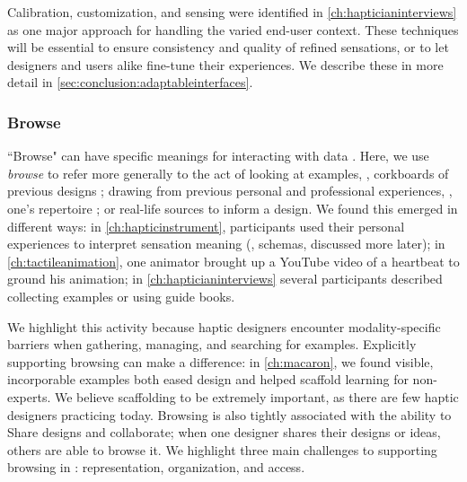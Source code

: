 
Calibration, customization, and sensing were identified in \autoref{ch:hapticianinterviews} as one major approach for handling the varied end-user context. 
These techniques will be essential to ensure consistency and quality of refined sensations, or to let designers and users alike fine-tune their experiences.
We describe these in more detail in \autoref{sec:conclusion:adaptableinterfaces}.


%
%
\subsubsection{Browse} 
``Browse" can have specific meanings for interacting with data \cite{munzner2014visualization}.
Here, we use \emph{browse} to refer more generally to the act of looking at examples, \eg, corkboards of previous designs \cite{Buxton2007}; drawing from previous personal and professional experiences, \eg, one's repertoire \cite{Schon1982}; or real-life sources to inform a design.
We found this emerged in different ways:
in \autoref{ch:hapticinstrument}, participants used their personal experiences to interpret sensation meaning (\ie, schemas, discussed more later);
in \autoref{ch:tactileanimation}, one animator brought up a YouTube video of a heartbeat to ground his animation;
in \autoref{ch:hapticianinterviews} several participants described collecting examples or using guide books.

We highlight this activity because haptic designers encounter modality-specific barriers when gathering, managing, and searching for examples.
Explicitly supporting browsing can make a difference:
in \autoref{ch:macaron}, we found visible, incorporable examples both eased design and helped scaffold learning for non-experts.
We believe scaffolding to be extremely important, as there are few haptic designers practicing today.
Browsing is also tightly associated with the ability to Share designs and collaborate; when one designer shares their designs or ideas, others are able to browse it.
We highlight three main challenges to supporting browsing in \haxd: representation, organization, and access.



